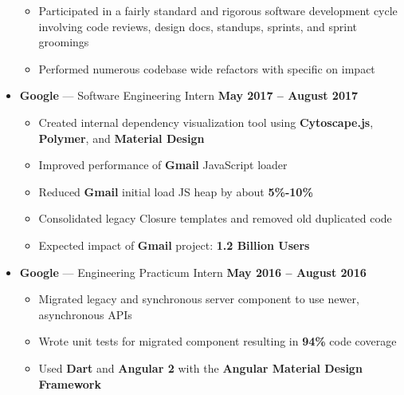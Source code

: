 \documentclass[10pt, oneside]{letter}
\newcommand{\textapprox}{\raisebox{0.5ex}{\texttildelow}}
\begin{document}
\begin{adjustwidth}{0.1in}{0pt}
\begin{itemize}
\begin{itemize}
              \item {
                Participated in a fairly standard and rigorous software development
                cycle involving code reviews, design docs, standups, sprints,
                and sprint groomings
              }

              \item {
                  Performed numerous codebase wide refactors with specific on
                  impact
              }
            \end{itemize}
        \item
          \textbf{Google} --- Software Engineering Intern \hfill \textbf{May 2017 -- August 2017}
            \begin{itemize}
              \item {
                  Created internal dependency visualization tool using
                  \textbf{Cytoscape.js}, \textbf{Polymer}, and \textbf{Material
                    Design}
              }
              \item Improved performance of \textbf{Gmail} JavaScript loader
              \item {
                  Reduced \textbf{Gmail} initial load JS heap by about
                  \textbf{5\%-10\%}
              }
              \item {
                  Consolidated legacy Closure templates and removed old
                  duplicated code
              }
              \item {
                  Expected impact of \textbf{Gmail} project:
                  \textbf{\textapprox 1.2 Billion Users}
              }
            \end{itemize}
        \item
          \textbf{Google} --- Engineering Practicum Intern \hfill \textbf{May 2016 -- August 2016}
            \begin{itemize}
              \item {
                  Migrated legacy and synchronous server component to use
                  newer, asynchronous APIs
              }
              \item {
                  Wrote unit tests for migrated component resulting in
                  \textbf{94\%} code coverage
              }
              \item {
                  Used \textbf{Dart} and \textbf{Angular 2} with the
                  \textbf{Angular Material Design Framework}
              }

\end{itemize}
\end{itemize}
\end{adjustwidth}
\end{document}
